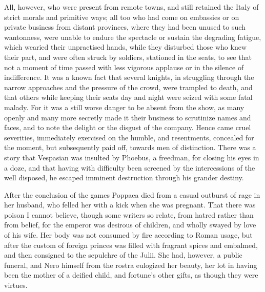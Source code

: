All, however, who were present from remote towns, and still retained the Italy of strict morals and primitive ways; all too who had come on embassies or on private business from distant provinces, where they had been unused to such wantonness, were unable to endure the spectacle or sustain the degrading fatigue, which wearied their unpractised hands, while they disturbed those who knew their part, and were often struck by soldiers, stationed in the seats, to see that not a moment of time passed with less vigorous applause or in the silence of indifference. It was a known fact that several knights, in struggling through the narrow approaches and the pressure of the crowd, were trampled to death, and that others while keeping their seats day and night were seized with some fatal malady. For it was a still worse danger to be absent from the show, as many openly and many more secretly made it their business to scrutinize names and faces, and to note the delight or the disgust of the company. Hence came cruel severities, immediately exercised on the humble, and resentments, concealed for the moment, but subsequently paid off, towards men of distinction. There was a story that Vespasian was insulted by Phoebus, a freedman, for closing his eyes in a doze, and that having with difficulty been screened by the intercessions of the well disposed, he escaped imminent destruction through his grander destiny.


After the conclusion of the games Poppaea died from a casual outburst of rage in her husband, who felled her with a kick when she was pregnant. That there was poison I cannot believe, though some writers so relate, from hatred rather than from belief, for the emperor was desirous of children, and wholly swayed by love of his wife. Her body was not consumed by fire according to Roman usage, but after the custom of foreign princes was filled with fragrant spices and embalmed, and then consigned to the sepulchre of the Julii. She had, however, a public funeral, and Nero himself from the rostra eulogized her beauty, her lot in having been the mother of a deified child, and fortune's other gifts, as though they were virtues.


